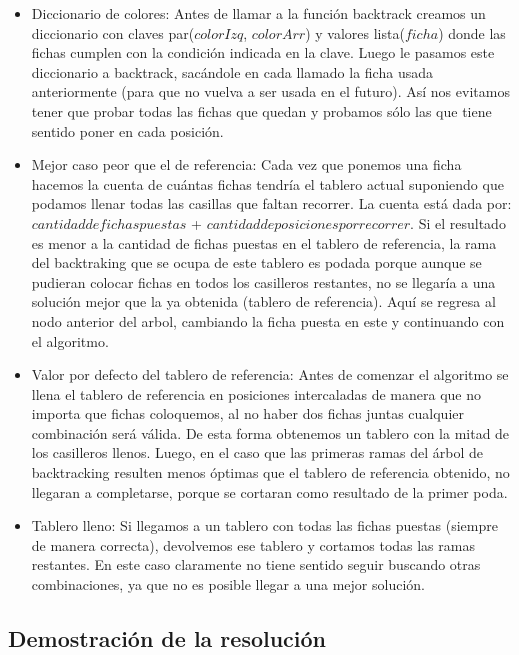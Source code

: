 \begin{itemize}

\item Diccionario de colores: Antes de llamar a la funci\'on backtrack creamos un diccionario con claves par($colorIzq$, $colorArr$) y valores lista($ficha$) donde las fichas cumplen con la condici\'on indicada en la clave. Luego le pasamos este diccionario a backtrack, sac\'andole en cada llamado la ficha usada anteriormente (para que no vuelva a ser usada en el futuro). As\'i nos evitamos tener que probar todas las fichas que quedan y probamos s\'olo las que tiene sentido poner en cada posici\'on.

\item Mejor caso peor que el de referencia: Cada vez que ponemos una ficha hacemos la cuenta de cu\'antas fichas tendr\'ia el tablero actual suponiendo que podamos llenar todas las casillas que faltan recorrer. La cuenta est\'a dada por: $cantidad de fichas puestas$ + $cantidad de posiciones por recorrer$. Si el resultado es menor a la cantidad de fichas puestas en el tablero de referencia, la rama del backtraking que se ocupa de este tablero es podada porque aunque se pudieran colocar fichas en todos los casilleros restantes, no se llegar\'ia a una soluci\'on mejor que la ya obtenida (tablero de referencia). Aqu\'i se regresa al nodo anterior del arbol, cambiando la ficha puesta en este y continuando con el algoritmo.

\item Valor por defecto del tablero de referencia: Antes de comenzar el algoritmo se llena el tablero de referencia en posiciones intercaladas de manera que no importa que fichas coloquemos, al no haber dos fichas juntas cualquier combinaci\'on ser\'a v\'alida. De esta forma obtenemos un tablero con la mitad de los casilleros llenos. Luego, en el caso que las primeras ramas del \'arbol de backtracking resulten menos \'optimas que el tablero de referencia obtenido, no llegaran a completarse, porque se cortaran como resultado de la primer poda.

\item Tablero lleno: Si llegamos a un tablero con todas las fichas puestas (siempre de manera correcta), devolvemos ese tablero y cortamos todas las ramas restantes. En este caso claramente no tiene sentido seguir buscando otras combinaciones, ya que no es posible llegar a una mejor soluci\'on.

\end{itemize}

\subsection{Demostraci\'on de la resoluci\'on}

